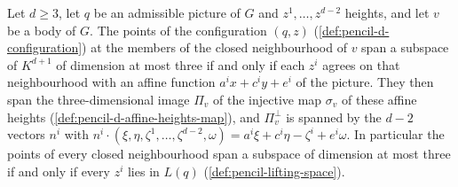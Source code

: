 \begin{lemma}
  \label{lem:pencil-d-condition-linear}
  \leanok
  Let $d \ge 3$, let $q$ be an admissible picture of $G$ and
  $z^1, \dots, z^{d-2}$ heights, and let $v$ be a body of $G$. The points
  of the configuration $(q, z)$ (\cref{def:pencil-d-configuration}) at
  the members of the closed neighbourhood of $v$ span a subspace of
  $K^{d+1}$ of dimension at most three if and only if each $z^i$ agrees
  on that neighbourhood with an affine function
  $a^i x + c^i y + e^i$ of the picture. They then span the
  three-dimensional image $\Pi_v$ of the injective map $\sigma_v$ of
  these affine heights (\cref{def:pencil-d-affine-heights-map}),
  and $\Pi_v^{\perp}$ is spanned by the $d - 2$ vectors $n^i$ with
  $n^i \cdot (\xi, \eta, \zeta^1, \dots, \zeta^{d-2}, \omega) =
  a^i \xi + c^i \eta - \zeta^i + e^i \omega$. In particular the points of
  every closed neighbourhood span a subspace of dimension at most three
  if and only if every $z^i$ lies in $L(q)$
  (\cref{def:pencil-lifting-space}).
\end{lemma}

